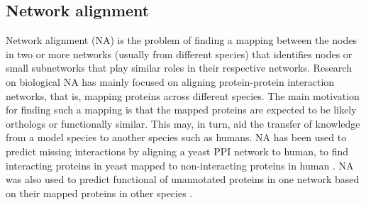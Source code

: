 \subsection{Network alignment}
\label{sec:networkalignment}
Network alignment (NA) is the problem of finding a mapping between the nodes in two or more networks (usually from different species) that identifies nodes or small subnetworks that play similar roles in their respective networks. Research on biological NA has mainly focused on aligning protein-protein interaction networks, that is, mapping proteins across different species. The main motivation for finding such a mapping is that the mapped proteins are expected to be likely orthologs or functionally similar. This may, in turn, aid the transfer of knowledge from a model species to another species such as humans. NA has been used to predict missing interactions by aligning a yeast PPI network to human, to find interacting proteins in yeast mapped to non-interacting proteins in human \cite{Malod-Dognin2015}. NA was also used to predict functional of unannotated proteins in one network based on their mapped proteins in other species \cite{Meng2016}.


